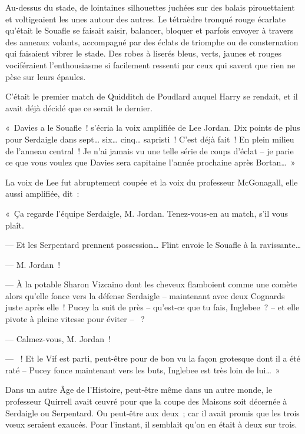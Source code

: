 \later

Au-dessus du stade, de lointaines silhouettes juchées sur des balais pirouettaient et voltigeaient les unes autour des autres. Le tétraèdre tronqué rouge écarlate qu'était le Souafle se faisait saisir, balancer, bloquer et parfois envoyer à travers des anneaux volants, accompagné par des éclats de triomphe ou de consternation qui faisaient vibrer le stade. Des robes à liserés bleus, verts, jaunes et rouges vociféraient l'enthousiasme si facilement ressenti par ceux qui savent que rien ne pèse sur leurs épaules.

C'était le premier match de Quidditch de Poudlard auquel Harry se rendait, et il avait déjà décidé que ce serait le dernier.

«~Davies a le Souafle~! s'écria la voix amplifiée de Lee Jordan. Dix points de plus pour Serdaigle dans sept… six… cinq… sapristi~! C'est déjà fait~! En plein milieu de l'anneau central~! Je n'ai jamais vu une telle série de coups d'éclat -- je parie ce que vous voulez que Davies sera capitaine l'année prochaine après Bortan…~»

La voix de Lee fut abruptement coupée et la voix du professeur McGonagall, elle aussi amplifiée, dit~:

«~Ça regarde l'équipe Serdaigle, M. Jordan. Tenez-vous-en au match, s'il vous plaît.

--- Et les Serpentard prennent possession… Flint envoie le Souafle à la ravissante…

--- M. Jordan~!

--- À la potable Sharon Vizcaino dont les cheveux flamboient comme une comète alors qu'elle fonce vers la défense Serdaigle -- maintenant avec deux Cognards juste après elle~! Pucey la suit de près -- qu'est-ce que tu fais, Inglebee~? -- et elle pivote à pleine vitesse pour éviter -- ~?

--- Calmez-vous, M. Jordan~!

--- ~! Et le Vif est parti, peut-être pour de bon vu la façon grotesque dont il a été raté -- Pucey fonce maintenant vers les buts, Inglebee est très loin de lui…~»

Dans un autre Âge de l'Histoire, peut-être même dans un autre monde, le professeur Quirrell avait œuvré pour que la coupe des Maisons soit décernée à Serdaigle ou Serpentard. Ou peut-être aux deux~; car il avait promis que les trois vœux seraient exaucés. Pour l'instant, il semblait qu'on en était à deux sur trois.

